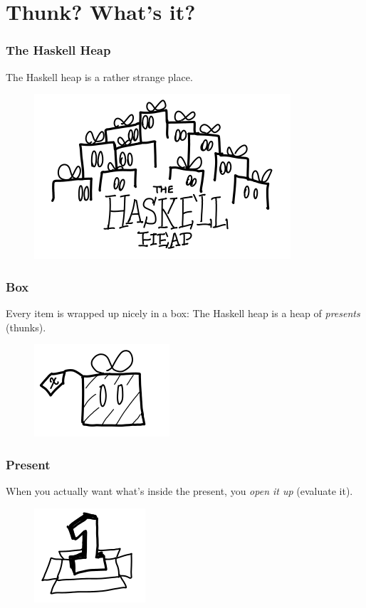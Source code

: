 \documentclass{beamer}
\begin{document}
\section{Thunk? What's it?}

\begin{frame}
\frametitle{The Haskell Heap}
\begin{center}
    The Haskell heap is a rather strange place.
\end{center}
\begin{figure}[hbt!]
    \centering
    \includegraphics[height=0.5\textheight]{./pic/haskell-heap.png}
\end{figure}
\end{frame}


\begin{frame}
\frametitle{Box}
Every item is wrapped up nicely in a box:\newline
The Haskell heap is a heap of \textit{presents} (thunks).
\begin{figure}[hbt!]
    \centering
    \includegraphics[height=0.4\textheight]{./pic/thunk.png}
\end{figure}
\end{frame}


\begin{frame}
\frametitle{Present}
When you actually want what’s inside the present, you \textit{open it up} (evaluate it).\newline
\begin{figure}[hbt!]
    \centering
    \includegraphics[height=0.4\textheight]{./pic/thunk-nullary.png}
\end{figure}
\end{frame}
\end{document}
